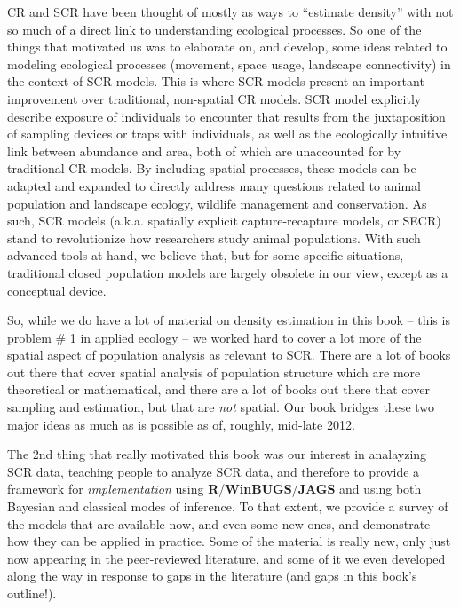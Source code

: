 CR and SCR have been thought of mostly as ways to ``estimate density''
with not so much of a direct link to understanding ecological
processes. So one of the things that motivated us was to elaborate on,
and develop, some ideas related to modeling ecological processes
(movement, space usage, landscape connectivity) in the context of SCR
models.  This is where SCR models present an important improvement
over traditional, non-spatial CR models.  SCR model explicitly
describe exposure of individuals to encounter that results from the
juxtaposition of sampling devices or traps with individuals, as well
as the ecologically intuitive link between abundance and area, both of
which are unaccounted for by traditional CR models. By including
spatial processes, these models can be adapted and expanded to
directly address many questions related to animal population and
landscape ecology, wildlife management and conservation.  As such, SCR
models (a.k.a.  spatially explicit capture-recapture models, or SECR)
stand to revolutionize how researchers study animal populations.  With
such advanced tools at hand, we believe that, but for some specific
situations, traditional closed population models are largely obsolete
in our view, except as a conceptual device.

So, while we do have a lot of material on density estimation in this
book -- this is problem \# 1 in applied ecology -- we worked hard to
cover a lot more of the spatial aspect of population analysis as
relevant to SCR.  There are a lot of books out there that cover
spatial analysis of population structure which are more theoretical or
mathematical, and there are a lot of books out there that cover
sampling and estimation, but that are {\it not} spatial. Our book
bridges these two major ideas as much as is possible as of, roughly,
mid-late 2012.

The 2nd thing that really motivated this book was our interest in
analayzing SCR data, teaching people to analyze SCR data, and
 therefore to provide a
framework for {\it implementation} using
\textbf{R}/\textbf{WinBUGS}/\textbf{JAGS} and using both Bayesian and
classical modes of inference.  To that extent, we provide a survey of
the models that are available now, and even some new ones, and
demonstrate how they can be applied in practice. Some of the material
is really new, only just now appearing in the peer-reviewed
literature, and some of it we even developed along the way in response to
gaps in the literature (and gaps in this book's outline!).

